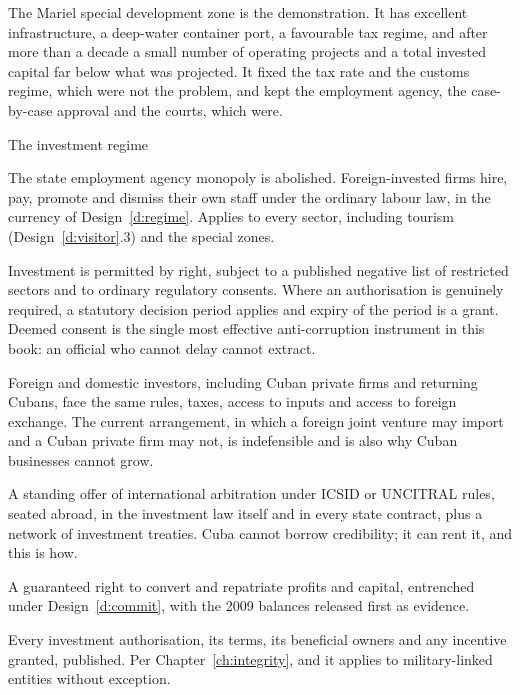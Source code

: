 The Mariel special development zone is the demonstration. It has excellent
infrastructure, a deep-water container port, a favourable tax regime, and after
more than a decade a small number of operating projects \citep{feinberg2016} and a total invested
capital far below what was projected. It fixed the tax rate and the customs
regime, which were not the problem, and kept the employment agency, the
case-by-case approval and the courts, which were.

\begin{design}{The investment regime}
\label{d:invest}
\begin{rules}
 The state employment agency monopoly is abolished.
Foreign-invested firms hire, pay, promote and dismiss their own staff under the
ordinary labour law, in the currency of Design~\ref{d:regime}. Applies to every
sector, including tourism (Design~\ref{d:visitor}.3) and the special zones.

 Investment is permitted by right, subject
to a published negative list of restricted sectors and to ordinary regulatory
consents. Where an authorisation is genuinely required, a statutory decision
period applies and expiry of the period is a grant. Deemed consent is the single
most effective anti-corruption instrument in this book: an official who cannot
delay cannot extract.

 Foreign and domestic investors, including Cuban
private firms and returning Cubans, face the same rules, taxes, access to inputs
and access to foreign exchange. The current arrangement, in which a foreign joint
venture may import and a Cuban private firm may not, is indefensible and is also
why Cuban businesses cannot grow.

 A standing offer of international arbitration under ICSID or
UNCITRAL rules, seated abroad, in the investment law itself and in every state
contract, plus a network of investment treaties. Cuba cannot borrow credibility;
it can rent it, and this is how.

 A guaranteed right to convert and repatriate profits and
capital, entrenched under Design~\ref{d:commit}, with the 2009 balances released
first as evidence.

 Every investment authorisation, its terms, its
beneficial owners and any incentive granted, published. Per
Chapter~\ref{ch:integrity}, and it applies to military-linked entities without
exception.
\end{rules}
\end{design}

